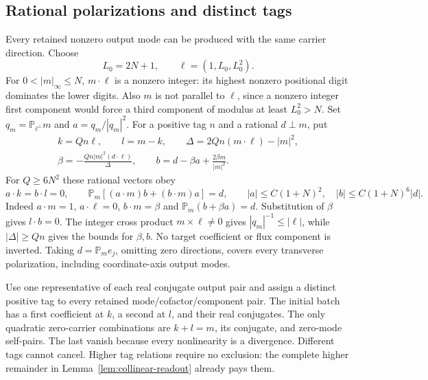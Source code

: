 \documentclass[11pt,a4paper]{amsart}
\theoremstyle{definition}
\theoremstyle{remark}
\numberwithin{equation}{section}
\newcommand{\PP}{\mathbb P}
\begin{document}
\subsection{Rational polarizations and distinct tags}
Every retained nonzero output mode can be produced with the same carrier
direction.  Choose
\begin{equation}\label{eq:rt-common-direction}
 L_0=2N+1,\qquad \ell=(1,L_0,L_0^2).
\end{equation}
For $0<|m|_\infty\le N$, $m\cdot\ell$ is a nonzero integer: its highest
nonzero positional digit dominates the lower digits.  Also $m$ is not
parallel to $\ell$, since a nonzero integer first component would force
a third component of modulus at least $L_0^2>N$.
Set $q_m=\PP_{\ell^\perp}m$ and $a=q_m/|q_m|^2$.  For a positive tag $n$
and a rational $d\perp m$, put
\begin{equation}\label{eq:rt-polarization}
 \begin{gathered}
 k=Qn\ell,\qquad l=m-k,\qquad
 \Delta=2Qn(m\cdot\ell)-|m|^2,\\
 \beta=-\frac{Qn|m|^2(d\cdot\ell)}\Delta,\qquad
 b=d-\beta a+\frac{2\beta m}{|m|^2}.
 \end{gathered}
\end{equation}
For $Q\ge6N^2$ these rational vectors obey
\begin{equation}\label{eq:rt-polarization-certificate}
 a\cdot k=b\cdot l=0,\qquad
 \PP_m[(a\cdot m)b+(b\cdot m)a]=d,
 \qquad |a|\le C(1+N)^2,\quad |b|\le C(1+N)^6|d|.
\end{equation}
Indeed $a\cdot m=1$, $a\cdot\ell=0$, $b\cdot m=\beta$ and
$\PP_m(b+\beta a)=d$.  Substitution of $\beta$ gives $l\cdot b=0$.
The integer cross product $m\times\ell\ne0$ gives
$|q_m|^{-1}\le|\ell|$, while $|\Delta|\ge Qn$ gives the bounds for
$\beta,b$.  No target coefficient or flux component is inverted.
Taking $d=\PP_me_j$, omitting zero directions, covers every transverse
polarization, including coordinate-axis output modes.

Use one representative of each real conjugate output pair and assign a
distinct positive tag to every retained mode/cofactor/component pair.
The initial batch has a first coefficient at $k$, a second at $l$, and
their real conjugates.  The only quadratic zero-carrier combinations
are $k+l=m$, its conjugate, and zero-mode self-pairs.  The last vanish
because every nonlinearity is a divergence.  Different tags cannot
cancel.  Higher tag relations require no exclusion: the complete higher
remainder in Lemma~\ref{lem:collinear-readout} already pays them.
\end{document}
